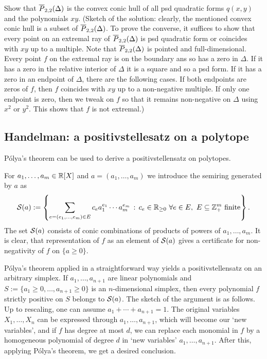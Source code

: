 \begin{exercise}
	Show that $\overline{P}_{2,2}(\Delta)$ is the convex conic hull of all psd quadratic forms $q(x,y)$ and the polynomials $xy$. (Sketch of the solution: clearly, the mentioned convex conic hull is a subset of $\overline{P}_{2,2}(\Delta)$. To prove the converse, it suffices to show that every point on an extremal ray of $\overline{P}_{2,2}(\Delta)$ is psd quadratic form or coincides with $xy$ up to a multiple. Note that $\overline{P}_{2,2}(\Delta)$ is pointed and full-dimensional. Every point $f$ on the extremal ray is on the boundary ans so has a zero in $\Delta$. If it has a zero in the relative interior of $\Delta$ it is a square and so a psd form. If it has a zero in an endpoint of $\Delta$, there are the following cases. If both endpoints are zeros of $f$, then $f$ coincides with $xy$ up to a non-negative multiple. If only one endpoint is zero, then we tweak on $f$ so that it remains non-negative on $\Delta$ using $x^2$ or $y^2$. This shows that $f$ is not extremal.)
\end{exercise}

\subsection{Handelman: a positivstellesatz on a polytope} 

P\'olya's theorem can be used to derive a positivstellensatz on polytopes.

For $a_1,\ldots,a_m \in \mathbb{R}[X]$ and $a=(a_1,\ldots,a_m)$ we introduce the semiring generated by $a$ as 
\[
	\cS(a) := \setcond{\sum_{e=(e_1,\ldots,e_m) \in E} c_e a_1^{e_1} \cdots a_m^{e_m} }{c_e \in \R_{\ge 0} \ \forall e \in E, \ E \subseteq \Z_+^m \ \text{finite}}.
\]
The set $\mathcal{S}(a)$ consists of conic combinations of products of powers of $a_1,\ldots,a_m$. It is clear, that representation of $f$ as an element of $\mathcal{S}(a)$ gives a certificate for non-negativity of $f$ on $\{a \ge 0\}$. 

\begin{remark}
P\'olya's theorem applied in a straightforward way yields a positivstellensatz on an arbitrary simplex. If $a_1,\ldots,a_{n+1}$ are linear polynomials and $S:=\{a_1 \ge 0,\ldots, a_{n+1} \ge 0\}$ is an $n$-dimensional simplex, then every polynomial $f$ strictly positive on $S$ belongs to $\mathcal{S}(a)$. The sketch of the argument is as follows. Up to rescaling, one can assume $a_1 + \cdots + a_{n+1} = 1$. The original variables $X_1,\ldots,X_n$ can be expressed through $a_1,\ldots,a_{n+1}$, which will become our `new variables', and if $f$ has degree at most $d$, we can replace each monomial in $f$ by a homogeneous polynomial of degree $d$ in `new variables' $a_1,\ldots,a_{n+1}$. After this, applying P\'olya's theorem, we get a desired conclusion. 
\end{remark}

